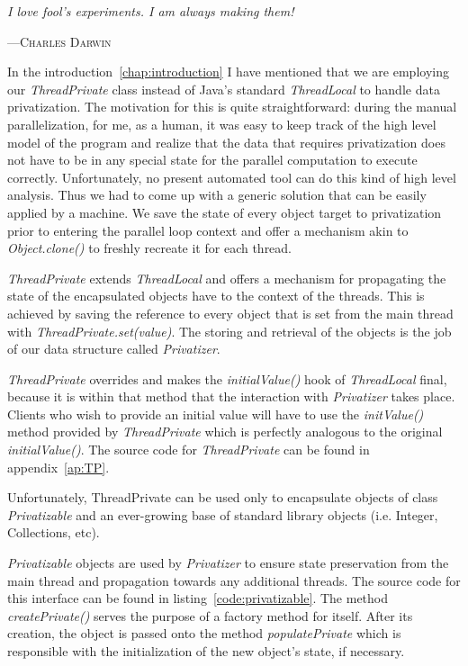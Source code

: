 \graphicspath{{content/privatization/figures/}}

\epigraph{\textit{I love fool's experiments. I am always making them!}}
{---\textsc{Charles Darwin}} 

In the introduction~\ref{chap:introduction} I have mentioned that we are
employing our \emph{ThreadPrivate} class instead of Java's standard
\emph{ThreadLocal} to handle data privatization. The motivation for this is
quite straightforward: during the manual parallelization, for me, as a human, it was
easy to keep track of the high level model of the program and realize that the
data that requires privatization does not have to be in any special state for
the parallel computation to execute correctly. Unfortunately, no present
automated tool can do this kind of high level analysis. Thus we had to come up
with a generic solution that can be easily applied by a machine. We save the
state of every object target to privatization prior to entering the parallel
loop context and offer a mechanism akin to \emph{Object.clone()} to freshly
recreate it for each thread.



\emph{ThreadPrivate} extends \emph{ThreadLocal} and offers a mechanism for
propagating the state of the encapsulated objects have to the context of the
threads. This is achieved by saving the reference to every object that is set
from the main thread with \emph{ThreadPrivate.set(value)}. The storing and
retrieval of the objects is the job of our data structure called
\emph{Privatizer}.

\emph{ThreadPrivate} overrides and makes the \emph{initialValue()} hook of
\emph{ThreadLocal} final, because it is within that method that the interaction
with \emph{Privatizer} takes place. Clients who wish to provide an initial value
will have to use the \emph{initValue()} method provided by \emph{ThreadPrivate}
which is perfectly analogous to the original \emph{initialValue()}. The source
code for \emph{ThreadPrivate} can be found in appendix~\ref{ap:TP}.

Unfortunately, ThreadPrivate can be used only to encapsulate objects of class
\emph{Privatizable} and an ever-growing base of standard library objects (i.e.
Integer, Collections, etc).

\emph{Privatizable} objects are used by \emph{Privatizer} to ensure state
preservation from the main thread and propagation towards any additional
threads. The source code for this interface can be found in
listing~\ref{code:privatizable}. The method \emph{createPrivate()} serves the
purpose of a factory method for itself. After its creation, the object is passed
onto the method \emph{populatePrivate} which is responsible with the
initialization of the new object's state, if necessary.


